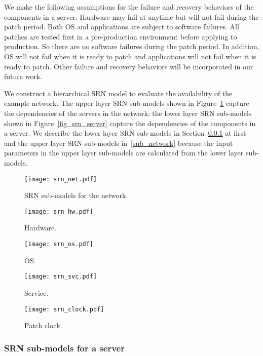 \documentclass[conference]{IEEEtran}
\begin{document}
We make the following assumptions for the failure and recovery behaviors of the components in a server. Hardware may fail at anytime but will not fail during the patch period. Both OS and applications are subject to software failures. All patches are tested first in a pre-production environment before applying to production. So there are no software failures during the patch period. In addition, OS will not fail when it is ready to patch and applications will not fail when it is ready to patch. Other failure and recovery behaviors will be incorporated in our future work.

We construct a hierarchical SRN model to evaluate the availability of the example network. The upper layer SRN sub-models shown in Figure~\ref{fig_srn_net} capture the dependencies of the servers in the network; the lower layer SRN sub-models shown in Figure~\ref{fig_srn_server} capture the dependencies of the components in a server. We describe the lower layer SRN sub-models in Section~\ref{sub_server} at first and the upper layer SRN sub-models in~\ref{sub_network} because the input parameters in the upper layer sub-models are calculated from the lower layer sub-models.
\begin{figure}[htb]
\centering
\texttt{[image: srn\_net.pdf]}
\caption{SRN sub-models for the network.}
\label{fig_srn_net}
\end{figure}
\begin{figure*}[htb]
    \centering
    \begin{subfigure}{0.135\textwidth}
            \texttt{[image: srn\_hw.pdf]}
            \caption{Hardware.}
    \end{subfigure}
    \begin{subfigure}{0.305\textwidth}
            \texttt{[image: srn\_os.pdf]}
            \caption{OS.}
    \end{subfigure}
    \begin{subfigure}{0.375\textwidth}
            \texttt{[image: srn\_svc.pdf]}
            \caption{Service.}
    \end{subfigure}
    \begin{subfigure}{0.165\textwidth}
            \texttt{[image: srn\_clock.pdf]}
            \caption{Patch clock.}
    \end{subfigure}
    \caption{SRN sub-models for a server.}
    \label{fig_srn_server}
\end{figure*}

\subsubsection{SRN sub-models for a server}
\label{sub_server}
\end{document}
